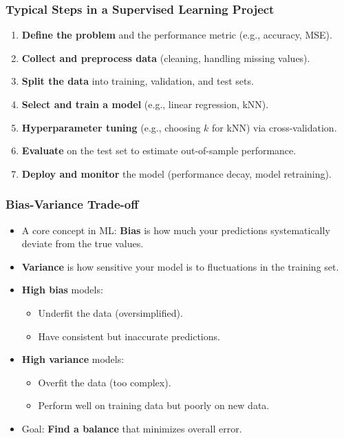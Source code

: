 \documentclass[aspectratio=169]{beamer}
\begin{document}
\begin{frame}
    \frametitle{Typical Steps in a Supervised Learning Project}
    \begin{enumerate}
        \item \textbf{Define the problem} and the performance metric (e.g., accuracy, MSE).
        \item \textbf{Collect and preprocess data} (cleaning, handling missing values).
        \item \textbf{Split the data} into training, validation, and test sets.
        \item \textbf{Select and train a model} (e.g., linear regression, kNN).
        \item \textbf{Hyperparameter tuning} (e.g., choosing $k$ for kNN) via cross-validation.
        \item \textbf{Evaluate} on the test set to estimate out-of-sample performance.
        \item \textbf{Deploy and monitor} the model (performance decay, model retraining).
    \end{enumerate}
\end{frame}

\begin{frame}
    \frametitle{Bias-Variance Trade-off}
    \begin{itemize}
        \item A core concept in ML: \textbf{Bias} is how much your predictions systematically deviate from the true values.
        \item \textbf{Variance} is how sensitive your model is to fluctuations in the training set.
        \item \textbf{High bias} models:
            \begin{itemize}
                \item Underfit the data (oversimplified).
                \item Have consistent but inaccurate predictions.
            \end{itemize}
        \item \textbf{High variance} models:
            \begin{itemize}
                \item Overfit the data (too complex).
                \item Perform well on training data but poorly on new data.
            \end{itemize}
        \item Goal: \textbf{Find a balance} that minimizes overall error.
    \end{itemize}
\end{frame}
\end{document}
